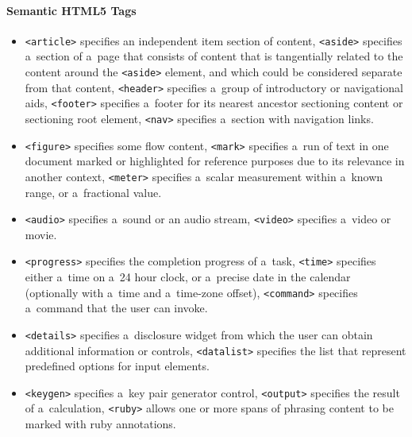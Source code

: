 \paragraph{Semantic HTML5 Tags}

\begin{itemize}
  \item \texttt{<article>} specifies an independent item
        section of content,
        \texttt{<aside>} specifies a~section of a~page that
        consists of content that is tangentially related
        to the content around the \texttt{<aside>} element,
        and which could be considered separate from
        that content, \texttt{<header>} specifies a~group of
        introductory or navigational aids,
        \texttt{<footer>} specifies a~footer for its nearest
        ancestor sectioning content or sectioning root element,
        \texttt{<nav>} specifies a~section with navigation links.
  \item \texttt{<figure>} specifies some flow content,
        \texttt{<mark>} specifies a~run of text in one document
        marked or highlighted for reference purposes
        due to its relevance in another context,
        \texttt{<meter>} specifies a~scalar measurement within
        a~known range, or a~fractional value.
  \item \texttt{<audio>} specifies a~sound or an audio stream,
        \texttt{<video>} specifies a~video or movie.
  \item \texttt{<progress>} specifies the completion progress
        of a~task, \texttt{<time>} specifies either a~time
        on a~24 hour clock, or a~precise date in the calendar
        (optionally with a~time and a~time-zone offset),
        \texttt{<command>} specifies a~command that the user
        can invoke.
  \item \texttt{<details>} specifies a~disclosure widget
        from which the user can obtain additional information or
        controls, \texttt{<datalist>} specifies the list that
        represent predefined options for input elements.
  \item \texttt{<keygen>} specifies a~key pair generator control,
        \texttt{<output>} specifies the result of a~calculation,
        \texttt{<ruby>} allows one or more spans of phrasing
        content to be marked with ruby annotations.
\end{itemize}

